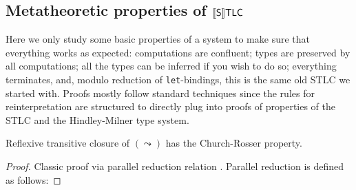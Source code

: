 \subsection{Metatheoretic properties of
\texorpdfstring{$\llbracket\mathsf{S}\rrbracket\mathsf{TLC}$}{[[S]]TLC}}
\label{SSTLC-properties}

Here we only study some basic properties of a system to
make sure that everything works as expected:
computations are confluent; types are preserved by all
computations; all the types can be inferred if you
wish to do so; everything terminates, and, modulo
reduction of \texttt{let}-bindings, this is the same old
STLC we started with. Proofs mostly follow
standard techniques since the rules for reinterpretation
are structured to directly plug into proofs of
properties of the STLC and the Hindley-Milner type
system.

\begin{theorem}
    Reflexive transitive closure of $(\leadsto)$ has
    the Church-Rosser property.
\end{theorem}
\begin{proof}
    Classic proof via parallel reduction relation
    \cite{takahashi1995parallel,barendregt1984lambda}.
    Parallel reduction is defined as follows:
\end{proof}

